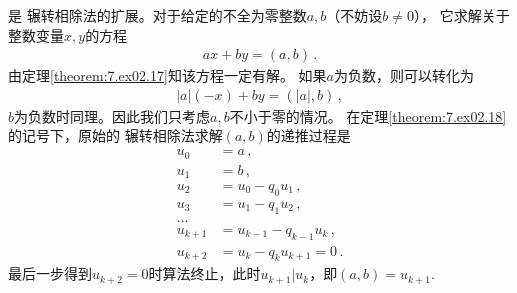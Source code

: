 是
辗转相除法的扩展。对于给定的不全为零整数$a,b$（不妨设$b\neq0$），
它求解关于整数变量$x,y$的方程
\begin{align}\label{eq:7.ex02.ExtendedEuclideanAlgorithm}
    ax+by=(a,b)\, .
\end{align}
由定理\ref{theorem:7.ex02.17}知该方程一定有解。
如果$a$为负数，则可以转化为
\begin{align}
    |a|(-x)+by=(|a|,b)\, ,
\end{align}
$b$为负数时同理。因此我们只考虑$a,b$不小于零的情况。
在定理\ref{theorem:7.ex02.18}的记号下，原始的
辗转相除法求解$(a,b)$的递推过程是
\begin{align}
    u_0     & =a\, ,\nonumber                  \\
    u_1     & =b\, ,\nonumber                  \\
    u_2     & =u_0-q_0u_1\, ,\nonumber         \\
    u_3     & =u_1-q_1u_2\, ,\nonumber         \\
    \ldots\nonumber                            \\
    u_{k+1} & =u_{k-1}-q_{k-1}u_k\, ,\nonumber \\
    u_{k+2} & =u_k-q_ku_{k+1}=0\, .
\end{align}
最后一步得到$u_{k+2}=0$时算法终止，此时$u_{k+1}|u_k$，即$(a,b)=u_{k+1}$.

